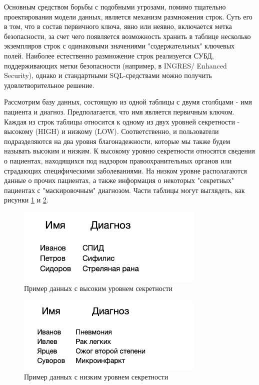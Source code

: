 Основным средством борьбы с подобными угрозами, помимо тщательно проектирования модели данных,
является механизм размножения строк. Суть его в том, что в состав первичного ключа, явно или неявно,
включается метка безопасности, за счет чего появляется возможность хранить в таблице несколько
экземпляров строк с одинаковыми значениями "содержательных" ключевых полей. Наиболее естественно
размножение строк реализуется  СУБД, поддерживающих метки безопасности (например, в INGRES/
Enhanced Security), однако и стандартными SQL-средствами можно получить удовлетворительное решение.

Рассмотрим базу данных, состоящую из одной таблицы с двумя столбцами - имя пациента и диагноз.
Предполагается, что имя является первичным ключом. Каждая из строк таблицы относится к одному
из двух уровней секретности - высокому (HIGH) и низкому (LOW). Соответственно, и пользователи
подразделяются на два уровня благонадежности, которые мы также будем называть высоким и низким.
К высокому уровню секретности относятся сведения о пациентах, находящихся под надзором
правоохранительных органов или страдающих специфическими заболеваниями. На низком уровне
располагаются данные о прочих пациентах, а также информация о некоторых "секретных" пациентах
с "маскировочным" диагнозом. Части таблицы могут выглядеть, как рисунки \ref{fig:NSD-1} и \ref{fig:NSD-2}.

\begin{figure}[h]
    \centering
    \includegraphics[width=0.8\textwidth]{assets/diagnoses1.png}
            \caption{Пример данных с высоким уровнем секретности}
    \label{fig:NSD-1}
\end{figure}

\begin{figure}[h]
    \centering
    \includegraphics[width=0.8\textwidth]{assets/diagnoses2.png}
        \caption{Пример данных с низким уровнем секретности}
    \label{fig:NSD-2}
\end{figure}

